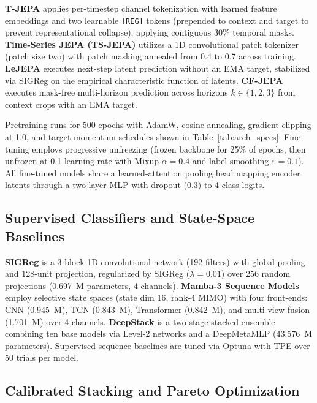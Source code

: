 \textbf{T-JEPA} \cite{thimonier2024tjepa} applies per-timestep channel tokenization with learned feature embeddings and two learnable \texttt{[REG]} tokens (prepended to context and target to prevent representational collapse), applying contiguous 30\% temporal masks.
\textbf{Time-Series JEPA (\ac{TS-JEPA})} \cite{tsjepa2024} utilizes a 1D convolutional patch tokenizer (patch size two) with patch masking annealed from 0.4 to 0.7 across training.
\textbf{LeJEPA} \cite{balestriero2025lejepa} executes next-step latent prediction without an \ac{EMA} target, stabilized via \ac{SIGReg} on the empirical characteristic function of latents.
\textbf{CF-JEPA} \cite{cfjepa2026} executes mask-free multi-horizon prediction across horizons $k \in \{1, 2, 3\}$ from context crops with an \ac{EMA} target.

Pretraining runs for 500 epochs with AdamW, cosine annealing, gradient clipping at 1.0, and target momentum schedules shown in Table~\ref{tab:arch_specs}. Fine-tuning employs progressive unfreezing (frozen backbone for 25\% of epochs, then unfrozen at 0.1 learning rate with Mixup $\alpha = 0.4$ and label smoothing $\varepsilon = 0.1$). All fine-tuned models share a learned-attention pooling head mapping encoder latents through a two-layer MLP with dropout (0.3) to 4-class logits.

\subsection{Supervised Classifiers and State-Space Baselines}

\textbf{\ac{SIGReg}} \cite{balestriero2025lejepa} is a 3-block 1D convolutional network (192 filters) with global pooling and 128-unit projection, regularized by \ac{SIGReg} ($\lambda = 0.01$) over 256 random projections (0.697~M parameters, 4 channels).
\textbf{Mamba-3 Sequence Models} \cite{gu2026mamba3} employ selective state spaces \cite{gu2023mamba} (state dim 16, rank-4 MIMO) with four front-ends: \ac{CNN} (0.945~M), \ac{TCN} \cite{bai2018tcn} (0.843~M), Transformer (0.842~M), and multi-view fusion (1.701~M) over 4 channels.
\textbf{DeepStack} is a two-stage stacked ensemble \cite{wolpert1992stacked} combining ten base models via Level-2 networks and a DeepMetaMLP (43.576~M parameters). Supervised sequence baselines are tuned via Optuna \cite{optuna2019} with \ac{TPE} over 50 trials per model.

\subsection{Calibrated Stacking and Pareto Optimization}


